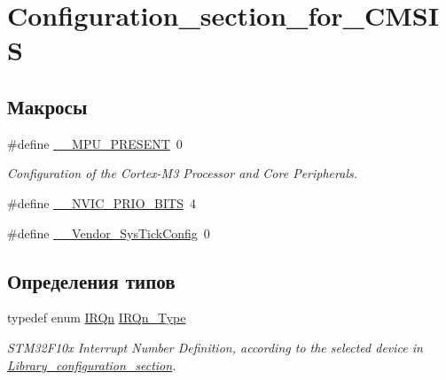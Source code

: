 \hypertarget{group___configuration__section__for___c_m_s_i_s}{}\section{Configuration\+\_\+section\+\_\+for\+\_\+\+C\+M\+S\+IS}
\label{group___configuration__section__for___c_m_s_i_s}
\subsection*{Макросы}
\begin{DoxyCompactItemize}
\item 
\#define \mbox{\hyperlink{group___configuration__section__for___c_m_s_i_s_ga4127d1b31aaf336fab3d7329d117f448}{\+\_\+\+\_\+\+M\+P\+U\+\_\+\+P\+R\+E\+S\+E\+NT}}~0
\begin{DoxyCompactList}\small\item\em Configuration of the Cortex-\/\+M3 Processor and Core Peripherals. \end{DoxyCompactList}\item 
\#define \mbox{\hyperlink{group___configuration__section__for___c_m_s_i_s_gae3fe3587d5100c787e02102ce3944460}{\+\_\+\+\_\+\+N\+V\+I\+C\+\_\+\+P\+R\+I\+O\+\_\+\+B\+I\+TS}}~4
\item 
\#define \mbox{\hyperlink{group___configuration__section__for___c_m_s_i_s_gab58771b4ec03f9bdddc84770f7c95c68}{\+\_\+\+\_\+\+Vendor\+\_\+\+Sys\+Tick\+Config}}~0
\end{DoxyCompactItemize}
\subsection*{Определения типов}
\begin{DoxyCompactItemize}
\item 
typedef enum \mbox{\hyperlink{group___configuration__section__for___c_m_s_i_s_ga666eb0caeb12ec0e281415592ae89083}{I\+R\+Qn}} \mbox{\hyperlink{group___configuration__section__for___c_m_s_i_s_gac3af4a32370fb28c4ade8bf2add80251}{I\+R\+Qn\+\_\+\+Type}}
\begin{DoxyCompactList}\small\item\em S\+T\+M32\+F10x Interrupt Number Definition, according to the selected device in \mbox{\hyperlink{group___library__configuration__section}{Library\+\_\+configuration\+\_\+section}}. \end{DoxyCompactList}\end{DoxyCompactItemize}

